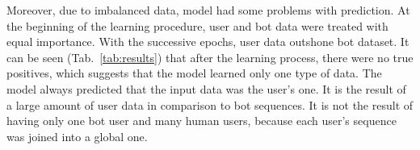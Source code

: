Moreover, due to imbalanced data, model had some problems with prediction. At the beginning of the learning procedure, user and bot data were treated with equal importance. With the successive epochs, user data outshone bot dataset. It can be seen \mbox{(Tab. \ref{tab:results})} that after the learning process, there were no true positives, which suggests that the model learned only one type of data. The model always predicted that the input data was the user's one. It is the result of a large amount of user data in comparison to bot sequences. It is not the result of having only one bot user and many human users, because each user's sequence was joined into a global one.\par
